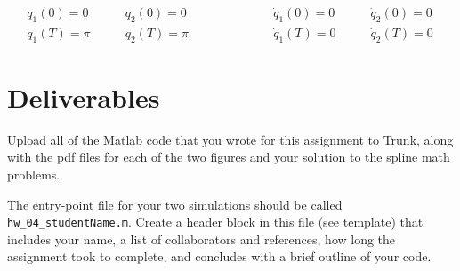 \begin{align}
&q_1(0) = 0   \quad & \quad   q_2(0) = 0
\quad\quad\quad & \quad\quad\quad
\dot{q}_1(0) = 0   \quad & \quad   \dot{q}_2(0) = 0  \quad\\
&q_1(T) = \pi   \quad & \quad   q_2(T) = \pi
\quad\quad\quad & \quad\quad\quad
\dot{q}_1(T) = 0   \quad & \quad   \dot{q}_2(T) = 0 \quad
\end{align}


\section*{Deliverables}

Upload all of the Matlab code that you wrote for this assignment to Trunk,
along with the pdf files for each of the two figures and
your solution to the spline math problems.

\par
The entry-point file for your two simulations should be called
\texttt{hw\_04\_studentName.m}.
Create a header block in this file (see template)
that includes your name,
a list of collaborators and references,
how long the assignment took to complete, and
concludes with a brief outline of your code.


